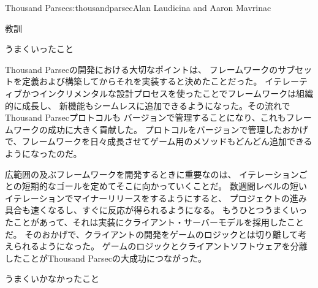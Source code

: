 \begin{aosachapter}{Thousand Parsec}{s:thousandparsec}{Alan Laudicina and Aaron Mavrinac}
\begin{aosasect1}{教訓}
\begin{aosasect2}{うまくいったこと}

Thousand Parsecの開発における大切なポイントは、
フレームワークのサブセットを定義および構築してからそれを実装すると決めたことだった。
イテレーティブかつインクリメンタルな設計プロセスを使ったことでフレームワークは組織的に成長し、
新機能もシームレスに追加できるようになった。その流れでThousand Parsecプロトコルも
バージョンで管理することになり、これもフレームワークの成功に大きく貢献した。
プロトコルをバージョンで管理したおかげで、フレームワークを日々成長させてゲーム用のメソッドもどんどん追加できるようになったのだ。

広範囲の及ぶフレームワークを開発するときに重要なのは、
イテレーションごとの短期的なゴールを定めてそこに向かっていくことだ。
数週間レベルの短いイテレーションでマイナーリリースをするようにすると、
プロジェクトの進み具合も速くなるし、すぐに反応が得られるようになる。
もうひとつうまくいったことがあって、それは実装にクライアント・サーバーモデルを採用したことだ。
そのおかげで、クライアントの開発をゲームのロジックとは切り離して考えられるようになった。
ゲームのロジックとクライアントソフトウェアを分離したことがThousand Parsecの大成功につながった。

\end{aosasect2}

\begin{aosasect2}{うまくいかなかったこと}


\end{aosasect2}
\end{aosasect1}
\end{aosachapter}
